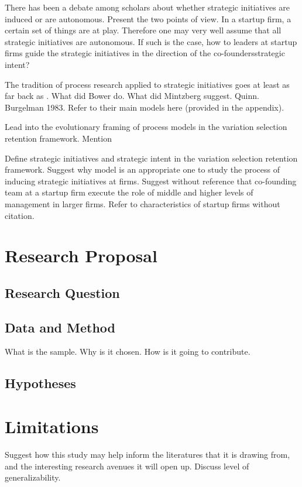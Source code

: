\documentclass[12pt,letterpaper]{article}
\begin{document}
There has been a debate among scholars about whether strategic initiatives are induced or are autonomous. Present the two points of view. In a startup firm, a certain set of things are at play. Therefore one may very well assume that all strategic initiatives are autonomous. If such is the case, how to leaders at startup firms guide the strategic initiatives in the direction of the co-founders\textquotesingle strategic intent?

The tradition of process research applied to strategic initiatives goes at least as far back as \cite{Bower1970}. What did Bower do. What did Mintzberg suggest. Quinn. Burgelman 1983. Refer to their main models here (provided in the appendix).

Lead into the evolutionary framing of process models in the variation selection retention framework. Mention \cite{Burgelman1991, Burgelman1994, Noda1996, Lovas2000}

Define strategic initiatives and strategic intent in the variation selection retention framework. Suggest why \cite{Lovas2000} model is an appropriate one to study the process of inducing strategic initiatives at firms. Suggest without reference that co-founding team at a startup firm execute the role of middle and higher levels of management in larger firms. Refer to characteristics of startup firms without citation.

\section{Research Proposal}
\subsection{Research Question}

\subsection{Data and Method}
What is the sample. Why is it chosen. How is it going to contribute.

\subsection{Hypotheses}

\section{Limitations}
Suggest how this study may help inform the literatures that it is drawing from, and the interesting research avenues it will open up. Discuss level of generalizability.
\end{document}
